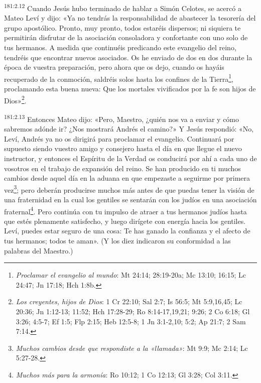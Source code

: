 \par
\textsuperscript{181:2.12} Cuando Jesús hubo terminado de hablar a Simón Celotes, se acercó a Mateo Leví y dijo: «Ya no tendrás la responsabilidad de abastecer la tesorería del grupo apostólico. Pronto, muy pronto, todos estaréis dispersos; ni siquiera te permitirán disfrutar de la asociación consoladora y confortante con uno solo de tus hermanos. A medida que continuéis predicando este evangelio del reino, tendréis que encontrar nuevos asociados. Os he enviado de dos en dos durante la época de vuestra preparación, pero ahora que os dejo, cuando os hayáis recuperado de la conmoción, saldréis solos hasta los confines de la Tierra\footnote{\textit{Proclamar el evangelio al mundo}: Mt 24:14; 28:19-20a; Mc 13:10; 16:15; Lc 24:47; Jn 17:18; Hch 1:8b.}, proclamando esta buena nueva: Que los mortales vivificados por la fe son hijos de Dios»\footnote{\textit{Los creyentes, hijos de Dios}: 1 Cr 22:10; Sal 2:7; Is 56:5; Mt 5:9,16,45; Lc 20:36; Jn 1:12-13; 11:52; Hch 17:28-29; Ro 8:14-17,19,21; 9:26; 2 Co 6:18; Gl 3:26; 4:5-7; Ef 1:5; Flp 2:15; Heb 12:5-8; 1 Jn 3:1-2,10; 5:2; Ap 21:7; 2 Sam 7:14.}.

\par
\textsuperscript{181:2.13} Entonces Mateo dijo: «Pero, Maestro, ¿quién nos va a enviar y cómo sabremos adónde ir? ¿Nos mostrará Andrés el camino?» Y Jesús respondió: «No, Leví, Andrés ya no os dirigirá para proclamar el evangelio. Continuará por supuesto siendo vuestro amigo y consejero hasta el día en que llegue el nuevo instructor, y entonces el Espíritu de la Verdad os conducirá por ahí a cada uno de vosotros en el trabajo de expansión del reino. Se han producido en ti muchos cambios desde aquel día en la aduana en que empezaste a seguirme por primera vez\footnote{\textit{Muchos cambios desde que respondiste a la «llamada»}: Mt 9:9; Mc 2:14; Lc 5:27-28.}; pero deberán producirse muchos más antes de que puedas tener la visión de una fraternidad en la cual los gentiles se sentarán con los judíos en una asociación fraternal\footnote{\textit{Muchos más para la armonía}: Ro 10:12; 1 Co 12:13; Gl 3:28; Col 3:11.}. Pero continúa con tu impulso de atraer a tus hermanos judíos hasta que estés plenamente satisfecho, y luego dirígete con energía hacia los gentiles. Leví, puedes estar seguro de una cosa: Te has ganado la confianza y el afecto de tus hermanos; todos te aman». (Y los diez indicaron su conformidad a las palabras del Maestro.)

